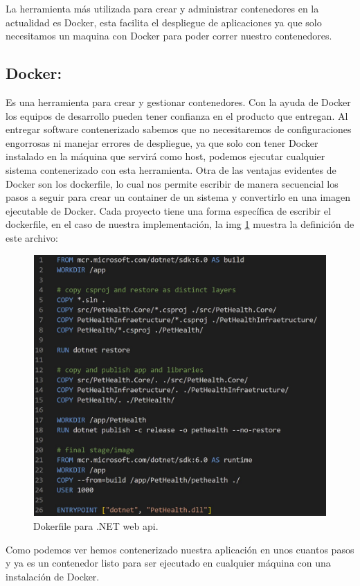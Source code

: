 La herramienta más utilizada para crear y administrar contenedores en la actualidad es Docker, esta facilita el despliegue de aplicaciones ya que solo necesitamos un maquina con Docker para poder correr nuestro contenedores.

\subsection{Docker:}

Es una herramienta para crear y gestionar contenedores. Con la ayuda de Docker los equipos de desarrollo pueden tener confianza en el producto que entregan. Al entregar software contenerizado sabemos que no necesitaremos de configuraciones engorrosas ni manejar errores de despliegue, ya que solo con  tener Docker instalado en la máquina que servirá como host, podemos ejecutar cualquier sistema contenerizado con esta herramienta. Otra de las ventajas evidentes de Docker son los dockerfile, lo cual nos permite escribir de manera secuencial los pasos a seguir para crear un container de un sistema y convertirlo en una imagen ejecutable de Docker. Cada proyecto tiene una forma específica de escribir el dockerfile, en el caso de nuestra implementación, la img \ref{fig:dockerfile} muestra la definición de este archivo:

\begin{figure}[H]
	\centering
	\includegraphics[width = 12cm, height=10cm]{Graphics/dokerfile.jpg}
	\caption{Dokerfile para .NET web api. }
	\label{fig:dockerfile}
\end{figure}

Como podemos ver hemos contenerizado nuestra aplicación en unos cuantos pasos y ya es un contenedor listo para ser ejecutado en cualquier máquina con una instalación de Docker.

